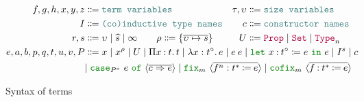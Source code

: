 \begin{figure}
\centering
\begin{align*}
f, g, h, x, y, z &\Coloneqq \meta{term variables} &
\tau, \upsilon &\Coloneqq \meta{size variables} \\
I &\Coloneqq \meta{(co)inductive type names} &
c &\Coloneqq \meta{constructor names} \\
r, s &\Coloneqq \upsilon \mid \succ{s} \mid \infty \qquad
\rho \Coloneqq \set{\vec{\upsilon \mapsto s}} &
U &\Coloneqq \Prop \mid \Set \mid \Type{n} \\
e, a, b, p, q, t, u, v, P &\Coloneqq \mathrlap{x \mid x^{\rho} \mid U \mid \prod{x}{t}{t} \mid \abs{x}{t^\circ}{e} \mid \app{e}{e} \mid \letin{x}{t^\circ}{e}{e} \mid I^s \mid c} \\
&\mathrlap{\mid \caseof{P^\circ}{e}{c}{e} \mid \fix{m}{f^n}{t^*}{e} \mid \cofix{m}{f}{t^*}{e}}
\end{align*}
\caption{Syntax of \lang terms}
\label{fig:terms-general}
\end{figure}


